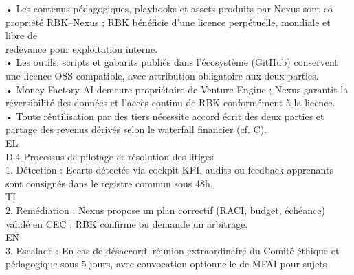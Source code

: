 \documentclass[12pt,landscape,a4paper]{article}
\begin{document}
\vspace{0.5em}
\vspace{0.5em}
\vspace{0.5em}
• Les contenus pédagogiques, playbooks et assets produits par Nexus sont co-propriété RBK–Nexus ; RBK bénéficie d’une licence perpétuelle, mondiale et libre de\\
redevance pour exploitation interne.\\
\vspace{0.5em}
• Les outils, scripts et gabarits publiés dans l’écosystème (GitHub) conservent une licence OSS compatible, avec attribution obligatoire aux deux parties.\\
\vspace{0.5em}
• Money Factory AI demeure propriétaire de Venture Engine ; Nexus garantit la réversibilité des données et l’accès continu de RBK conformément à la licence.\\
\vspace{0.5em}
• Toute réutilisation par des tiers nécessite accord écrit des deux parties et partage des revenus dérivés selon le waterfall financier (cf. C).\\
\vspace{0.5em}
\vspace{0.5em}
\vspace{0.5em}
\vspace{0.5em}
EL\\
D.4 Processus de pilotage et résolution des litiges\\
1. Détection : Ecarts détectés via cockpit KPI, audits ou feedback apprenants sont consignés dans le registre commun sous 48h.\\
\vspace{0.5em}
\vspace{0.5em}
\vspace{0.5em}
\vspace{0.5em}
TI\\
2. Remédiation : Nexus propose un plan correctif (RACI, budget, échéance) validé en CEC ; RBK confirme ou demande un arbitrage.\\
\vspace{0.5em}
\vspace{0.5em}
\vspace{0.5em}
\vspace{0.5em}
EN\\
3. Escalade : En cas de désaccord, réunion extraordinaire du Comité éthique et pédagogique sous 5 jours, avec convocation optionnelle de MFAI pour sujets\\
\end{document}
